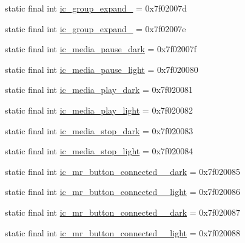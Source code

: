 \begin{CompactItemize}
\item 
static final int \hyperlink{classandroid_1_1support_1_1v7_1_1cardview_1_1_r_1_1drawable_c583463f980363bc3a8390b67f27f8d0}{ic\_\-group\_\-expand\_} = 0x7f02007d
\item 
static final int \hyperlink{classandroid_1_1support_1_1v7_1_1cardview_1_1_r_1_1drawable_7c9d9201433e79db838b866f3cfe58a1}{ic\_\-group\_\-expand\_} = 0x7f02007e
\item 
static final int \hyperlink{classandroid_1_1support_1_1v7_1_1cardview_1_1_r_1_1drawable_92fc1c15407126ba856b1143dba8465e}{ic\_\-media\_\-pause\_\-dark} = 0x7f02007f
\item 
static final int \hyperlink{classandroid_1_1support_1_1v7_1_1cardview_1_1_r_1_1drawable_af604475713d114cdff0df77da9f089d}{ic\_\-media\_\-pause\_\-light} = 0x7f020080
\item 
static final int \hyperlink{classandroid_1_1support_1_1v7_1_1cardview_1_1_r_1_1drawable_997b5712baebf6eea1de94e0afcd4f5f}{ic\_\-media\_\-play\_\-dark} = 0x7f020081
\item 
static final int \hyperlink{classandroid_1_1support_1_1v7_1_1cardview_1_1_r_1_1drawable_db9e1d2d1a7b718774b13c6293472d68}{ic\_\-media\_\-play\_\-light} = 0x7f020082
\item 
static final int \hyperlink{classandroid_1_1support_1_1v7_1_1cardview_1_1_r_1_1drawable_b032ef1172d3448329c0c7fbc9c0b850}{ic\_\-media\_\-stop\_\-dark} = 0x7f020083
\item 
static final int \hyperlink{classandroid_1_1support_1_1v7_1_1cardview_1_1_r_1_1drawable_427a66a3bf06c0dad3baad3da950ef88}{ic\_\-media\_\-stop\_\-light} = 0x7f020084
\item 
static final int \hyperlink{classandroid_1_1support_1_1v7_1_1cardview_1_1_r_1_1drawable_b7e8b92504af0ce331c29503906af9c3}{ic\_\-mr\_\-button\_\-connected\_\_\-dark} = 0x7f020085
\item 
static final int \hyperlink{classandroid_1_1support_1_1v7_1_1cardview_1_1_r_1_1drawable_c2501d2b5896aa5e63552ce683c7c979}{ic\_\-mr\_\-button\_\-connected\_\_\-light} = 0x7f020086
\item 
static final int \hyperlink{classandroid_1_1support_1_1v7_1_1cardview_1_1_r_1_1drawable_fa1967b2399fb0b6ff17660e27256b3c}{ic\_\-mr\_\-button\_\-connected\_\_\-dark} = 0x7f020087
\item 
static final int \hyperlink{classandroid_1_1support_1_1v7_1_1cardview_1_1_r_1_1drawable_24145a4c24cbd3415bd786433b3533ae}{ic\_\-mr\_\-button\_\-connected\_\_\-light} = 0x7f020088

\end{CompactItemize}
